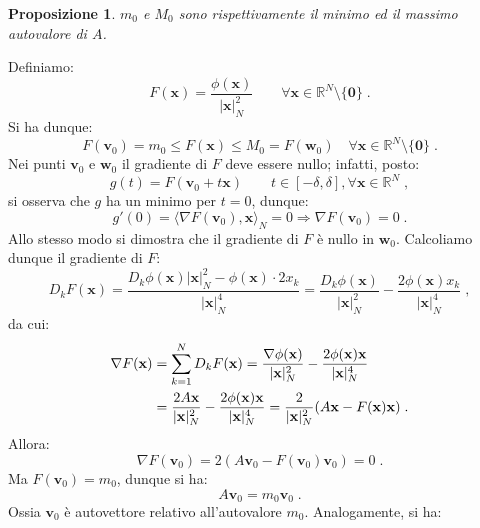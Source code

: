 \documentclass[a4paper,12pt]{report}
\theoremstyle{plain}
\newtheorem{prop}{Proposizione}[section]
\theoremstyle{definition}
\theoremstyle{remark}
\numberwithin{equation}{section}
\begin{document}
\begin{prop} $m_0$ e $M_0$ sono rispettivamente il minimo ed il massimo autovalore di $A$.
\end{prop}
\proof Definiamo:
\begin{equation}
F(\mathbf{x})=\frac{\phi(\mathbf{x})}{|\mathbf{x}|_N^2} \qquad \forall \mathbf{x} \in \mathbb{R}^N \setminus \{\mathbf{0}\}\;.
\end{equation}
Si ha dunque:
\begin{equation}
F(\mathbf{v}_0)=m_0 \le F(\mathbf{x}) \le M_0=F(\mathbf{w}_0) \quad \forall \mathbf{x} \in \mathbb{R}^N \setminus \{\mathbf{0}\}\;.
\end{equation}
Nei punti $\mathbf{v}_0$ e $\mathbf{w}_0$ il gradiente di $F$ deve essere nullo; infatti, posto:
\begin{equation}
g(t)=F(\mathbf{v}_0+t\mathbf{x}) \qquad t \in [-\delta,\delta], \forall \mathbf{x} \in \mathbb{R}^N\;,
\end{equation}
si osserva che $g$ ha un minimo per $t=0$, dunque:
\begin{equation}
g'(0)=\langle \nabla F(\mathbf{v}_0),\mathbf{x}\rangle_N=0 \Longrightarrow \nabla F(\mathbf{v}_0)=0\;.
\end{equation}
Allo stesso modo si dimostra che il gradiente di $F$ è nullo in $\mathbf{w}_0$. Calcoliamo dunque il gradiente di $F$:
\begin{equation}
D_kF(\mathbf{x})=\frac{D_k\phi(\mathbf{x})|\mathbf{x}|_N^2-\phi(\mathbf{x})\cdot 2x_k}{|\mathbf{x}|_N^4}= \frac{D_k\phi(\mathbf{x})}{
|\mathbf{x}|_N^2}-\frac{2\phi(\mathbf{x})x_k}{|\mathbf{x}|_N^4}\;,
\end{equation}
da cui:
\begin{align}
\nabla F(\mathbf{x}) &= \sum_{k=1}^N D_kF(\mathbf{x})=\frac{\nabla \phi(\mathbf{x})}{|\mathbf{x}|_N^2}-\frac{2\phi(\mathbf{x})\mathbf{x}}{|\mathbf{x}|_N^4} \notag \\
&= \frac{2A\mathbf{x}}{|\mathbf{x}|_N^2}-\frac{2\phi(\mathbf{x})\mathbf{x}}{|\mathbf{x}|_N^4}=\frac{2}{|\mathbf{x}|_N^2}(A\mathbf{x}-F(\mathbf{x})\mathbf{x})\;.
\end{align}
Allora:
\begin{equation}
\nabla F(\mathbf{v}_0)=2(A\mathbf{v}_0-F(\mathbf{v}_0)\mathbf{v}_0)=0\;.
\end{equation}
Ma $F(\mathbf{v}_0)=m_0$, dunque si ha:
\begin{equation}
A\mathbf{v}_0=m_0\mathbf{v}_0\;.
\end{equation}
Ossia $\mathbf{v}_0$ è autovettore relativo all'autovalore $m_0$. Analogamente, si ha:
\end{document}

